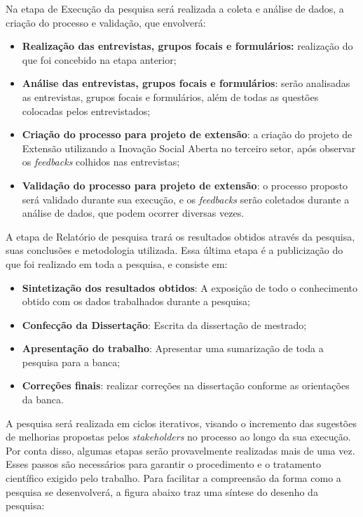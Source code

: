 Na etapa de Execução da pesquisa será realizada a coleta e análise de dados, a criação do processo e validação, que envolverá: 
\begin{itemize}
    \item \textbf{Realização das entrevistas, grupos focais e formulários:} realização do que foi concebido na etapa anterior;
    \item \textbf{Análise das entrevistas, grupos focais e formulários}: serão analisadas as entrevistas, grupos focais e formulários, além de todas as questões colocadas pelos entrevistados;
    \item \textbf{Criação do processo para projeto de extensão}: a criação do projeto de Extensão utilizando a Inovação Social Aberta no terceiro setor, após observar os \textit{feedbacks} colhidos nas entrevistas;
    \item \textbf{Validação do processo para projeto de extensão}: o processo proposto será validado durante sua execução, e os \textit{feedbacks} serão coletados durante a análise de dados, que podem ocorrer diversas vezes.
\end{itemize}

A etapa de Relatório de pesquisa trará os resultados obtidos através da pesquisa, suas conclusões e metodologia utilizada. Essa última etapa é a publicização do que foi realizado em toda a pesquisa, e consiste em:
\begin{itemize}
    \item \textbf{Sintetização dos resultados obtidos}: A exposição de todo o conhecimento obtido com os dados trabalhados durante a pesquisa;
    \item \textbf{Confecção da Dissertação}: Escrita da dissertação de mestrado;
    \item \textbf{Apresentação do trabalho}: Apresentar uma sumarização de toda a pesquisa para a banca;
    \item \textbf{Correções finais}: realizar correções na dissertação conforme as orientações da banca.
\end{itemize}

A pesquisa será realizada em ciclos iterativos, visando o incremento das sugestões de melhorias propostas pelos \textit{stakeholders} no processo ao longo da sua execução. Por conta disso, algumas etapas serão provavelmente realizadas mais de uma vez. Esses passos são necessários para garantir o procedimento e o tratamento científico exigido pelo trabalho. Para facilitar a compreensão da forma como a pesquisa se desenvolverá, a figura abaixo traz uma síntese do desenho da pesquisa:



